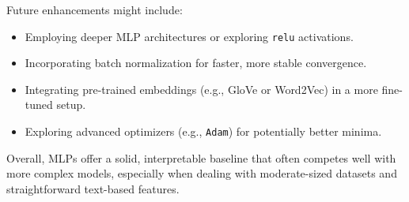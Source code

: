 Future enhancements might include:

\begin{itemize}
    \item Employing deeper MLP architectures or exploring \texttt{relu} activations.
    \item Incorporating batch normalization for faster, more stable convergence.
    \item Integrating pre-trained embeddings (e.g., GloVe or Word2Vec) in a more fine-tuned setup.
    \item Exploring advanced optimizers (e.g., \texttt{Adam}) for potentially better minima.
\end{itemize}

Overall, MLPs offer a solid, interpretable baseline that often competes well with more complex models, especially when dealing with moderate-sized datasets and straightforward text-based features.

